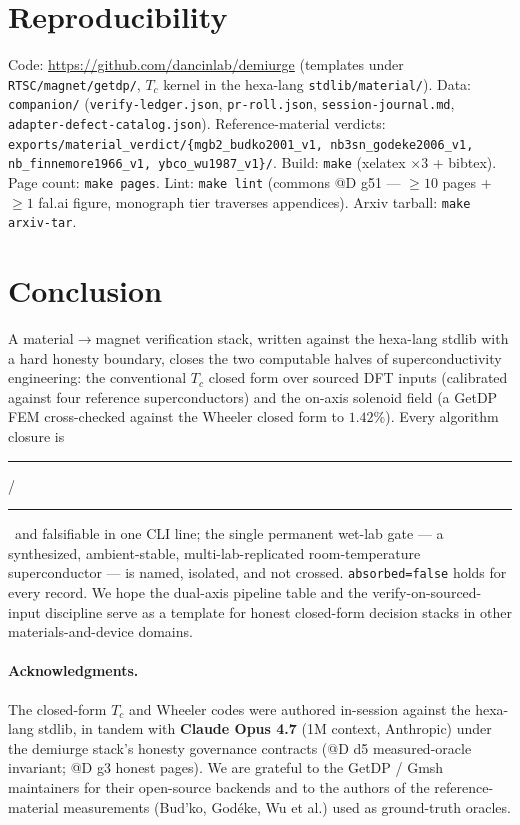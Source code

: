 \documentclass[11pt,a4paper]{article}
\newcommand{\tierdisc}[1]{\textcolor{#1}{\rule[0.05ex]{1.0ex}{1.0ex}}}
\newcommand{\tierBlue}{\tierdisc{blue!70!black}}
\newcommand{\tierGreen}{\tierdisc{green!60!black}}
\begin{document}
\section{Reproducibility}
\label{sec:repro}

Code: \url{https://github.com/dancinlab/demiurge} (templates under
\texttt{RTSC/magnet/getdp/}, $T_c$ kernel in the hexa-lang
\texttt{stdlib/material/}). Data: \texttt{companion/}
(\texttt{verify-ledger.json}, \texttt{pr-roll.json},
\texttt{session-journal.md}, \texttt{adapter-defect-catalog.json}).
Reference-material verdicts:
\texttt{exports/material\_verdict/\{mgb2\_budko2001\_v1,
nb3sn\_godeke2006\_v1, nb\_finnemore1966\_v1, ybco\_wu1987\_v1\}/}.
Build: \texttt{make} (xelatex $\times 3$ + bibtex). Page count:
\texttt{make pages}. Lint: \texttt{make lint} (commons @D g51 ---
$\ge\!10$ pages + $\ge\!1$ fal.ai figure, monograph tier traverses
appendices). Arxiv tarball: \texttt{make arxiv-tar}.

\section{Conclusion}
\label{sec:conclusion}

A material$\to$magnet verification stack, written against the hexa-lang
stdlib with a hard honesty boundary, closes the two computable halves
of superconductivity engineering: the conventional $T_c$ closed form
over sourced DFT inputs (calibrated against four reference
superconductors) and the on-axis solenoid field (a GetDP FEM
cross-checked against the Wheeler closed form to $1.42\%$). Every
algorithm closure is \tierBlue/\tierGreen\ and falsifiable in one CLI
line; the single permanent wet-lab gate --- a synthesized,
ambient-stable, multi-lab-replicated room-temperature superconductor
--- is named, isolated, and not crossed. \texttt{absorbed=false} holds
for every record. We hope the dual-axis pipeline table and the
verify-on-sourced-input discipline serve as a template for honest
closed-form decision stacks in other materials-and-device domains.

\paragraph{Acknowledgments.} The closed-form $T_c$ and Wheeler codes
were authored in-session against the hexa-lang stdlib, in tandem with
\textbf{Claude Opus 4.7} (1M context, Anthropic) under the demiurge
stack's honesty governance contracts (@D d5 measured-oracle invariant;
@D g3 honest pages). We are grateful to the GetDP / Gmsh maintainers
for their open-source backends and to the authors of the reference-material
measurements (Bud'ko, God\'{e}ke, Wu et al.) used as ground-truth oracles.
\end{document}
